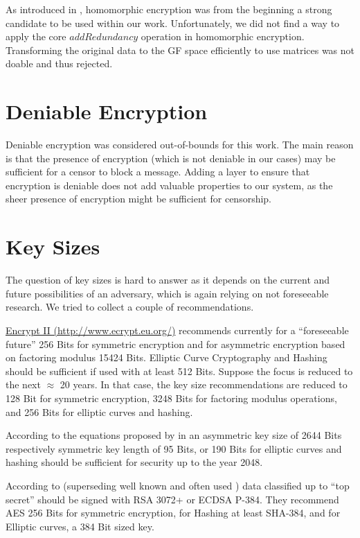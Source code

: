 As introduced in \cite{feldman1987practical}, homomorphic encryption was from the beginning a strong candidate to be used within our work. Unfortunately, we did not find a way to apply the core $addRedundancy$ operation in homomorphic encryption. Transforming the original data to the GF space efficiently to use matrices was not doable and thus rejected.


\section{Deniable Encryption}
Deniable encryption was considered out-of-bounds for this work. The main reason is that the presence of encryption (which is not deniable in our cases) may be sufficient for a censor to block a message. Adding a layer to ensure that encryption is deniable does not add valuable properties to our system, as the sheer presence of encryption might be sufficient for censorship. 

\section{Key Sizes\label{sec:keySize}}
The question of key sizes is hard to answer as it depends on the current and future possibilities of an adversary, which is again relying on not foreseeable research. We tried to collect a couple of recommendations.

\href{http://www.ecrypt.eu.org/}{Encrypt II (http://www.ecrypt.eu.org/)} recommends currently for a ``foreseeable future'' 256 Bits for symmetric encryption and for asymmetric encryption based on factoring modulus 15424 Bits. Elliptic Curve Cryptography and Hashing should be sufficient if used with at least 512 Bits. Suppose the focus is reduced to the next $\approx$ 20 years. In that case, the key size recommendations are reduced to 128 Bit for symmetric encryption, 3248 Bits for factoring modulus operations, and 256 Bits for elliptic curves and hashing.

According to the equations proposed by \citeauthor{Lenstra04keylength.} in \cite{Lenstra04keylength.} an asymmetric key size of 2644 Bits respectively symmetric key length of 95 Bits, or 190 Bits for elliptic curves and hashing should be sufficient for security up to the year 2048. 

According to \cite{CNSASuite} (superseding well known and often used \cite{nsa-fact-sheet-B}) data classified up to ``top secret'' should be signed with RSA 3072+ or ECDSA P-384.  They recommend AES 256 Bits for symmetric encryption, for Hashing at least SHA-384, and for Elliptic curves, a 384 Bit sized key.


